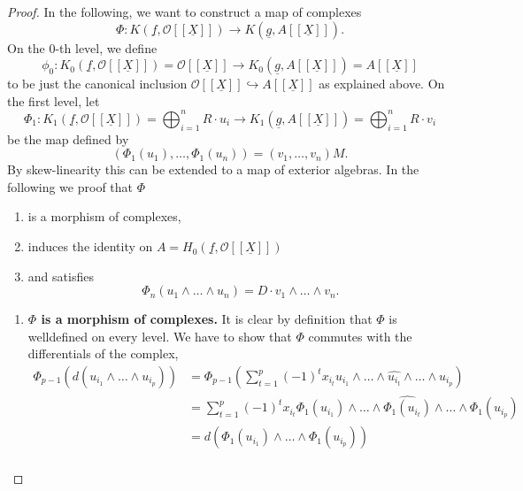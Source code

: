 \documentclass{article}
\theoremstyle{plain}%
\theoremstyle{definition}
\theoremstyle{remark}
\begin{document}
\begin{proof}
    In the following, we want to construct a map of complexes
    \[\Phi\colon K(\underline{f}, \mathcal{O}[[\underline{X}]]) \to K(\underline{g}, A[[\underline{X}]]).\]
    On the 0-th level, we define 
    \[
        \phi_0 \colon K_0(\underline{f}, \mathcal{O}[[\underline{X}]]) = \mathcal{O}[[\underline{X}]] 
        \to 
        K_0(\underline{g}, A[[\underline{X}]]) = A[[\underline{X}]]
    \]
    to be just the canonical inclusion \(\mathcal{O}[[\underline{X}]] \hookrightarrow A[[\underline{X}]]\)
    as explained above.
    On the first level, let
    \[
        \Phi_1 \colon 
            K_1(\underline{f}, \mathcal{O}[[\underline{X}]]) = \bigoplus_{i = 1}^n R \cdot u_i
            \to 
            K_1(\underline{g}, A[[\underline{X}]]) = \bigoplus_{i=1}^n R \cdot v_i
    \]
    be the map defined by
    \[
        (\Phi_1(u_1), \dots, \Phi_1(u_n)) = (v_1, \dots, v_n)M. %
    \]
    By skew-linearity this can be extended to a map of exterior algebras. %
    In the following we proof that \(\Phi\)
    \begin{enumerate}
        \item is a morphism of complexes,
        \item induces the identity on \(A = H_0(\underline{f}, \mathcal{O}[[\underline{X}]])\)
        \item and satisfies
        \[
            \Phi_n(u_1 \wedge \dots \wedge u_n) = D \cdot v_1 \wedge \dots \wedge v_n.  
        \]
    \end{enumerate}
    \begin{enumerate}
        \item \textbf{\(\Phi\) is a morphism of complexes.}
        It is clear by definition that \(\Phi\) is welldefined on every level.
        We have to show that \(\Phi\) commutes with the differentials of the complex,
        \begin{align*}
            \Phi_{p-1}(d(u_{i_1}\!\wedge\!\dots\!\wedge\!u_{i_p})) 
            &= \Phi_{p-1}\left(\sum_{t=1}^p(-1)^t x_{i_t} 
            u_{i_1}\!\wedge\!\dots\!\wedge\!\widehat{u_{i_t}}\!\wedge\!\dots\!\wedge\!u_{i_p}\right)\\
            &= \sum_{t=1}^p(-1)^t x_{i_t}\Phi_1(u_{i_1})\!\wedge\!\dots\!
            \wedge\widehat{\Phi_1(u_{i_t})}\!\wedge\!\dots\!\wedge\!\Phi_1(u_{i_p})\\
            &= d(\Phi_1(u_{i_1})\wedge\dots\wedge \Phi_1(u_{i_p}))\\

\end{align*}
\end{enumerate}
\end{proof}
\end{document}
